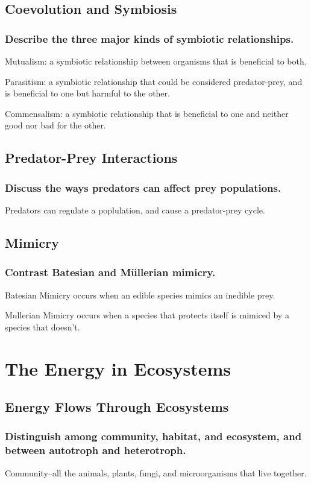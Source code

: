 \documentclass[a4paper]{article}
\begin{document}
\subsection{Coevolution and Symbiosis}
\subsubsection{Describe the three major kinds of symbiotic relationships.}
Mutualism: a symbiotic relationship between organisms that is beneficial to both.

Parasitism: a symbiotic relationship that could be considered predator-prey, and is beneficial to one but harmful to the other.

Commensalism: a symbiotic relationship that is beneficial to one and neither good nor bad for the other.

\subsection{Predator-Prey Interactions}
\subsubsection{Discuss the ways predators can affect prey populations.}
Predators can regulate a poplulation, and cause a predator-prey cycle.

\subsection{Mimicry}
\subsubsection{Contrast Batesian and Müllerian mimicry.}
Batesian Mimicry occurs when an edible species mimics an inedible prey.

Mullerian Mimicry occurs when a species that protects itself is mimiced by a species that doesn't.


\section{The Energy in Ecosystems}
\subsection{Energy Flows Through Ecosystems}
\subsubsection{Distinguish among community, habitat, and ecosystem, and between autotroph and heterotroph.}
Community--all the animals, plants, fungi, and microorganisms that live together.
\end{document}
